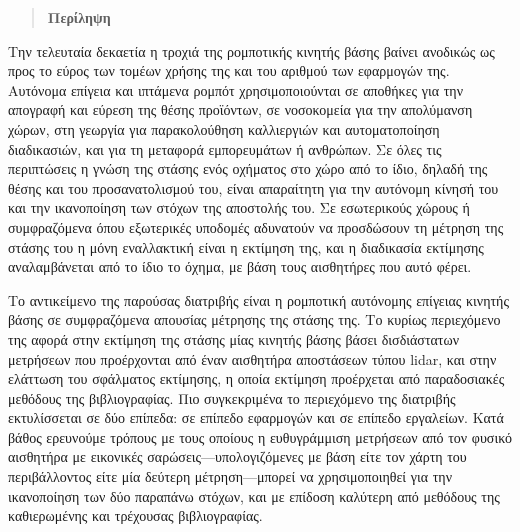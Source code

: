 \singlespace

\vfill
\begin{quotation}
\begin{center}
\textbf{Περίληψη}
\end{center}
\noindent
\end{quotation}

Την τελευταία δεκαετία η τροχιά της ρομποτικής κινητής βάσης βαίνει ανοδικώς ως
προς το εύρος των τομέων χρήσης της και του αριθμού των εφαρμογών της. Αυτόνομα
επίγεια και ιπτάμενα ρομπότ χρησιμοποιούνται σε αποθήκες για την απογραφή και
εύρεση της θέσης προϊόντων, σε νοσοκομεία για την απολύμανση χώρων, στη γεωργία
για παρακολούθηση καλλιεργιών και αυτοματοποίηση διαδικασιών, και για τη
μεταφορά εμπορευμάτων ή ανθρώπων. Σε όλες τις περιπτώσεις η γνώση της στάσης
ενός οχήματος στο χώρο από το ίδιο, δηλαδή της θέσης και του προσανατολισμού
του, είναι απαραίτητη για την αυτόνομη κίνησή του και την ικανοποίηση των
στόχων της αποστολής του. Σε εσωτερικούς χώρους ή συμφραζόμενα όπου εξωτερικές
υποδομές αδυνατούν να προσδώσουν τη μέτρηση της στάσης του η μόνη εναλλακτική
είναι η εκτίμηση της, και η διαδικασία εκτίμησης αναλαμβάνεται από το ίδιο το
όχημα, με βάση τους αισθητήρες που αυτό φέρει.

Το αντικείμενο της παρούσας διατριβής είναι η ρομποτική αυτόνομης επίγειας
κινητής βάσης σε συμφραζόμενα απουσίας μέτρησης της στάσης της. Το κυρίως
περιεχόμενο της αφορά στην εκτίμηση της στάσης μίας κινητής βάσης βάσει
δισδιάστατων μετρήσεων που προέρχονται από έναν αισθητήρα αποστάσεων τύπου
lidar, και στην ελάττωση του σφάλματος εκτίμησης, η οποία εκτίμηση προέρχεται
από παραδοσιακές μεθόδους της βιβλιογραφίας. Πιο συγκεκριμένα το περιεχόμενο
της διατριβής εκτυλίσσεται σε δύο επίπεδα: σε επίπεδο εφαρμογών και σε επίπεδο
εργαλείων. Κατά βάθος ερευνούμε τρόπους με τους οποίους η ευθυγράμμιση
μετρήσεων από τον φυσικό αισθητήρα με εικονικές σαρώσεις---υπολογιζόμενες με
βάση είτε τον χάρτη του περιβάλλοντος είτε μία δεύτερη μέτρηση---μπορεί να
χρησιμοποιηθεί για την ικανοποίηση των δύο παραπάνω στόχων, και με επίδοση
καλύτερη από μεθόδους της καθιερωμένης και τρέχουσας βιβλιογραφίας.

